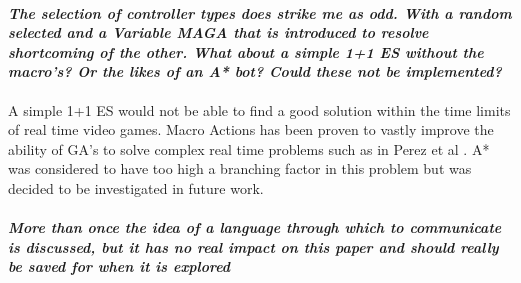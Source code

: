 \documentclass{article}
\begin{document}
\paragraph*{\textit{The selection of controller types does strike me as odd.  With a random selected and a Variable MAGA that is introduced to resolve shortcoming of the other.  What about a simple 1+1 ES without the macro's?  Or the likes of an A* bot?  Could these not be implemented?}}
A simple 1+1 ES would not be able to find a good solution within the time limits of real time video games. Macro Actions has been proven to vastly improve the ability of GA's to solve complex real time problems such as in Perez et al \cite{perez2013rolling}. A* was considered to have too high a branching factor in this problem but was decided to be investigated in future work.
\paragraph*{\textit{More than once the idea of a language through which to communicate is discussed, but it has no real impact on this paper and should really be saved for when it is explored}}



\end{document}
